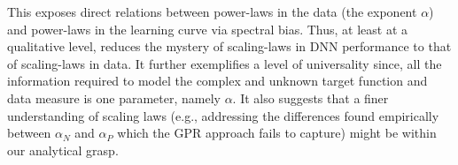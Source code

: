 This exposes direct relations between power-laws in the data (the exponent $\alpha$) and power-laws in the learning curve via spectral bias. Thus, at least at a qualitative level, reduces the mystery of scaling-laws in DNN performance to that of scaling-laws in data. It further exemplifies a level of universality since, all the information required to model the complex and unknown target function and data measure is one parameter, namely $\alpha$. It also suggests that a finer understanding of scaling laws (e.g., addressing the differences found empirically between $\alpha_N$ and $\alpha_P$ which the GPR approach fails to capture) might be within our analytical grasp. 


